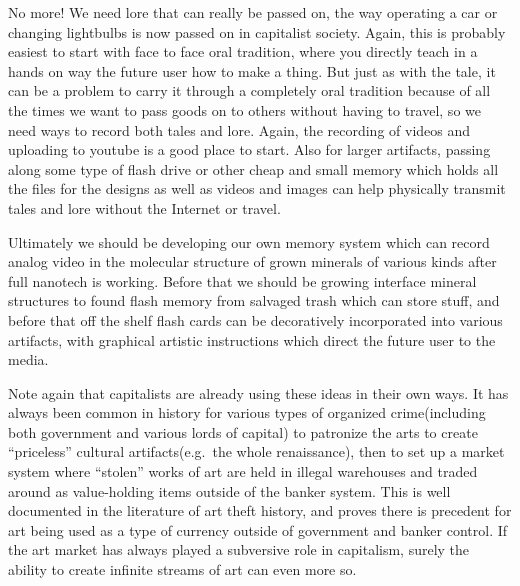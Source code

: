 No more! We need lore that can really be passed on, the way operating a
car or changing lightbulbs is now passed on in capitalist society.
Again, this is probably easiest to start with face to face oral
tradition, where you directly teach in a hands on way the future user
how to make a thing. But just as with the tale, it can be a problem to
carry it through a completely oral tradition because of all the times we
want to pass goods on to others without having to travel, so we need
ways to record both tales and lore. Again, the recording of videos and
uploading to youtube is a good place to start. Also for larger
artifacts, passing along some type of flash drive or other cheap and
small memory which holds all the files for the designs as well as videos
and images can help physically transmit tales and lore without the
Internet or travel.

Ultimately we should be developing our own memory system which can
record analog video in the molecular structure of grown minerals of
various kinds after full nanotech is working. Before that we should be
growing interface mineral structures to found flash memory from salvaged
trash which can store stuff, and before that off the shelf flash cards
can be decoratively incorporated into various artifacts, with graphical
artistic instructions which direct the future user to the media.

Note again that capitalists are already using these ideas in their own
ways. It has always been common in history for various types of
organized crime(including both government and various lords of capital)
to patronize the arts to create ``priceless'' cultural
artifacts(e.g.~the whole renaissance), then to set up a market system
where ``stolen'' works of art are held in illegal warehouses and traded
around as value-holding items outside of the banker system. This is well
documented in the literature of art theft history, and proves there is
precedent for art being used as a type of currency outside of government
and banker control. If the art market has always played a subversive
role in capitalism, surely the ability to create infinite streams of art
can even more so.

